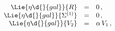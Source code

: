 \begin{equation}\label{eq:defn:gal}
  \begin{array}{rcl}
\Lie{\eta\d{}{gal}}{R} &=& 0\,,\\
\Lie{\eta\d{}{gal}}{\Sigma^{(1)}} &=& 0\,,\\
\Lie{\eta\d{}{gal}}{V_{2}}&=&\alpha\,V_1\,,
  \end{array}
\end{equation}

